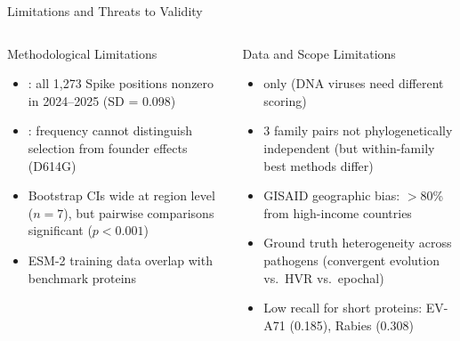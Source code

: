 \begin{frame}{Limitations and Threats to Validity}
  \begin{columns}[T]
    \begin{block}{Methodological Limitations}
      \begin{itemize}
        \item {}: all 1,273 Spike positions nonzero in 2024--2025 (SD = 0.098)
        \item {}: frequency cannot distinguish selection from founder effects (D614G)
        \item Bootstrap CIs wide at region level ($n=7$), but pairwise comparisons significant ($p < 0.001$)
        \item ESM-2 training data overlap with benchmark proteins
      \end{itemize}
    \end{block}

    \begin{block}{Data and Scope Limitations}
      \begin{itemize}
        \item {} only (DNA viruses need different scoring)
        \item 3 family pairs not phylogenetically independent (but within-family best methods differ)
        \item GISAID geographic bias: $>$80\% from high-income countries
        \item Ground truth heterogeneity across pathogens (convergent evolution vs.\ HVR vs.\ epochal)
        \item Low recall for short proteins: EV-A71 (0.185), Rabies (0.308)
      \end{itemize}
    \end{block}
  \end{columns}
\end{frame}

